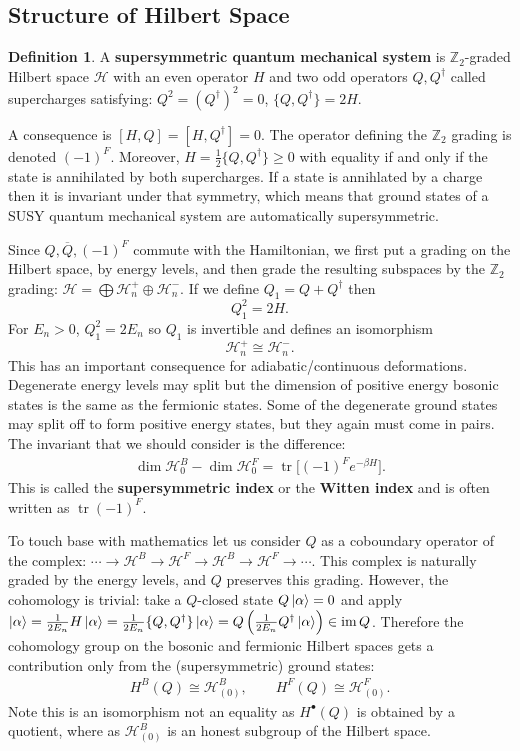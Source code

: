 \documentclass{report}
\theoremstyle{plain}
\theoremstyle{definition}
\newtheorem{definition}[theorem]{Definition}
\theoremstyle{remark}
\newcommand{\bZ}{\mathbb{Z}}
\DeclareMathOperator{\im}{im}
\newcommand{\mc}{\mathcal}
\newcommand{\cnj}{\overline}
\newcommand{\dsum}{\oplus}
\newcommand{\FR}[2]{\frac{#1}{#2}}
\DeclareMathOperator{\Tr}{tr}
\begin{document}
\subsection{Structure of Hilbert Space}
\begin{definition}
A \textbf{supersymmetric quantum mechanical system} is $\bZ_2$-graded
Hilbert space $\mc H$ with an even operator $H$ and two odd operators
$Q,Q^\dag$ called supercharges satisfying: $Q^2=(Q^\dagger)^2=0$,
$\{Q,Q^\dag\}=2H$.
\end{definition}
A consequence is $[H,Q]=[H,Q^\dag]=0$. The operator defining the $\bZ_2$
grading is denoted $(-1)^F$. Moreover, $H = \FR{1}{2}\{Q,Q^\dagger\}\ge0$
with equality if and only if the state is annihilated by both supercharges.
If a state is annihlated by a charge then it is invariant under that
symmetry, which means that ground states of a SUSY quantum mechanical
system are automatically supersymmetric.

Since $Q,\cnj Q, (-1)^F$ commute with the Hamiltonian, we first put a
grading on the Hilbert space, by energy levels, and then grade the
resulting subspaces by the $\bZ_2$ grading: $\mc H = \bigoplus \mc
H_n^+\dsum \mc H_n^-$. If we define $Q_1=Q+Q^\dagger$ then \[Q_1^2=2H.\]
For $E_n > 0$, $Q_1^2 = 2E_n$ so $Q_1$ is invertible and defines an
isomorphism \[\mc H^+_n \cong \mc H^-_n.\] 
This has an important consequence for adiabatic/continuous deformations.
Degenerate energy levels may split but the dimension of positive energy
bosonic states is the same as the fermionic states. Some of the degenerate
ground states may split off to form positive energy states, but they again
must come in pairs. The invariant that we should consider is the
difference:
\begin{align} \dim \mc H^B_0 - \dim \mc H^F_0 
= \Tr \bigl[(-1)^Fe^{-\beta H}\bigr].\label{WittenIndex} 
\end{align}
This is called the \textbf{supersymmetric index} or the \textbf{Witten
index} and is often written as $\Tr(-1)^F$. 

To touch base with mathematics let us consider $Q$ as a coboundary operator
of the complex: $\cdots \to \mc H^B\to \mc H^F \to \mc H^B \to \mc H^F \to
\cdots$. This complex is naturally graded by the energy levels, and $Q$
preserves this grading. However, the cohomology is trivial: take a
$Q$-closed state $Q\ket{\alpha}=0$ and apply $\ket\alpha = \FR{1}{2E_n}H
\ket\alpha = \FR{1}{2E_n}\{Q,Q^\dagger\}\ket\alpha = Q \left( \FR{1}{2E_n}
Q^\dagger\ket\alpha \right) \in \im Q$. Therefore the cohomology group on
the bosonic and fermionic Hilbert spaces gets a contribution only from the
(supersymmetric) ground states:
\begin{align} H^B(Q) \cong \mc H^B_{(0)},\qquad H^F(Q) \cong \mc H^F_{(0)}.
\label{groundStateCohom}
\end{align}
Note this is an isomorphism not an equality as $H^\bullet(Q)$ is obtained
by a quotient, where as $\mc H^B_{(0)}$ is an honest subgroup of the
Hilbert space.
\end{document}
